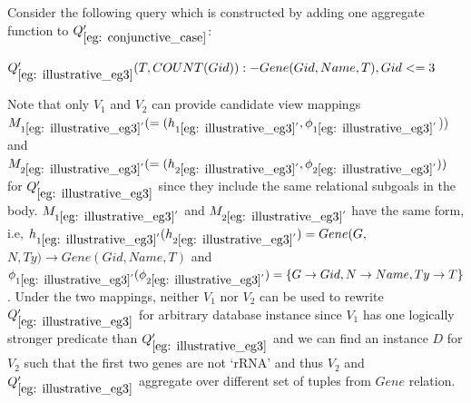 \begin{example} \label{eg: illustrative_eg3}
Consider the following query which is constructed by adding one aggregate function to $Q_{\ref{eg: conjunctive_case}}'$:
\begin{tabbing}
$Q_{\ref{eg: illustrative_eg3}}'(T, COUNT(Gid)) :- Gene(Gid, Name, T), Gid <= 3$
\end{tabbing}
Note that only $V_1$ and $V_2$ can provide candidate view mappings $M_{1{\ref{eg: illustrative_eg3}}'}(=(h_{1{\ref{eg: illustrative_eg3}}'}, \phi_{1{\ref{eg: illustrative_eg3}}'}$)) and $M_{2{\ref{eg: illustrative_eg3}}'}(=(h_{2{\ref{eg: illustrative_eg3}}'}, \phi_{2{\ref{eg: illustrative_eg3}}'}))$ for $Q_{\ref{eg: illustrative_eg3}}'$ since they include the same relational subgoals in the body. $M_{1{\ref{eg: illustrative_eg3}}'}$ and $M_{2{\ref{eg: illustrative_eg3}}'}$ have the same form, i.e, $h_{1\ref{eg: illustrative_eg3}'}(h_{2\ref{eg: illustrative_eg3}'}) = Gene(G,$ $N, Ty) \rightarrow Gene(Gid, Name, T)$ and $\phi_{1\ref{eg: illustrative_eg3}'} (\phi_{2\ref{eg: illustrative_eg3}'}) = \{G\rightarrow Gid, N \rightarrow Name, Ty\rightarrow T\}$. Under the two mappings, neither $V_1$  nor $V_2$ can be used to rewrite $Q_{\ref{eg: illustrative_eg3}}'$ for arbitrary database instance since $V_1$ has one logically stronger predicate than $Q_{\ref{eg: illustrative_eg3}}'$ and we can find an instance $D$ for $V_2$ such that the first two genes are not `rRNA' and thus $V_2$ and $Q_{\ref{eg: illustrative_eg3}}'$ aggregate over different set of tuples from $Gene$ relation. 





\end{example}
